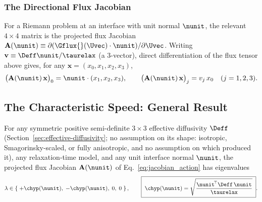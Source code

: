 \subsubsection{The Directional Flux Jacobian}
For a Riemann problem at an interface with unit normal $\nunit$, the
relevant $4\times4$ matrix is the projected flux Jacobian
$\mathbf A(\nunit) \equiv \partial(\Gflux{}(\Uvec)\cdot\nunit)/\partial\Uvec$.
Writing $\mathbf v \equiv \Deff\nunit/\taurelax$ (a 3-vector), direct
differentiation of the flux tensor above gives, for any $\mathbf x =
(x_0,x_1,x_2,x_3)$,
\begin{equation}
  \label{eq:jacobian_action}
  \big(\mathbf A(\nunit)\,\mathbf x\big)_0 = \nunit\cdot(x_1,x_2,x_3) ,
  \qquad
  \big(\mathbf A(\nunit)\,\mathbf x\big)_j = v_j\, x_0 \quad (j=1,2,3) .
\end{equation}

\subsection{The Characteristic Speed: General Result}
\label{sec:main-theorem}

\begin{proposition}
\label{prop:main}
For any symmetric positive semi-definite $3\times3$ effective diffusivity
$\Deff$ (Section~\ref{sec:effective-diffusivity}; no assumption on its
shape: isotropic, Smagorinsky-scaled, or fully anisotropic, and no
assumption on which  produced it), any
relaxation-time model, and any unit interface normal $\nunit$, the
projected flux Jacobian $\mathbf A(\nunit)$ of Eq.~\eqref{eq:jacobian_action}
has eigenvalues
\begin{equation}
  \label{eq:main_result}
  \lambda \in \left\{ \; +\chyp(\nunit),\; -\chyp(\nunit),\; 0,\; 0 \; \right\} ,
  \qquad
  \boxed{\;\chyp(\nunit) = \sqrt{\dfrac{\nunit^{\!\top}\Deff\,\nunit}{\taurelax}}\;} .
\end{equation}
\end{proposition}

